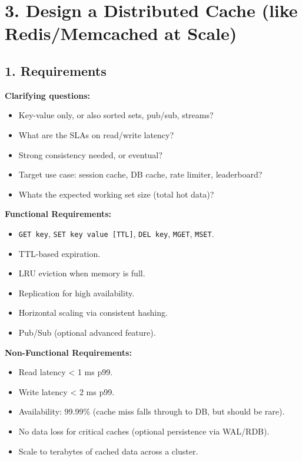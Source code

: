 \documentclass[11pt]{article}
\providecommand{\tightlist}{\setlength{\itemsep}{1pt}\setlength{\parskip}{0pt}}
\begin{document}
\section{3. Design a Distributed Cache (like Redis/Memcached at Scale)}\label{3-design-a-distributed-cache-like-redismemcached-at-scale}

\subsection{1. Requirements}\label{1-requirements-2}

\textbf{Clarifying questions:}

\begin{itemize}
\tightlist
\item
  Key-value only, or also sorted sets, pub/sub, streams?
\item
  What are the SLAs on read/write latency?
\item
  Strong consistency needed, or eventual?
\item
  Target use case: session cache, DB cache, rate limiter, leaderboard?
\item
  What\textquotesingle s the expected working set size (total hot data)?
\end{itemize}

\textbf{Functional Requirements:}

\begin{itemize}
\tightlist
\item
  \texttt{GET\ key}, \texttt{SET\ key\ value\ {[}TTL{]}}, \texttt{DEL\ key}, \texttt{MGET}, \texttt{MSET}.
\item
  TTL-based expiration.
\item
  LRU eviction when memory is full.
\item
  Replication for high availability.
\item
  Horizontal scaling via consistent hashing.
\item
  Pub/Sub (optional advanced feature).
\end{itemize}

\textbf{Non-Functional Requirements:}

\begin{itemize}
\tightlist
\item
  Read latency \textless{} 1 ms p99.
\item
  Write latency \textless{} 2 ms p99.
\item
  Availability: 99.99\% (cache miss falls through to DB, but should be rare).
\item
  No data loss for critical caches (optional persistence via WAL/RDB).
\item
  Scale to terabytes of cached data across a cluster.
\end{itemize}
\end{document}
